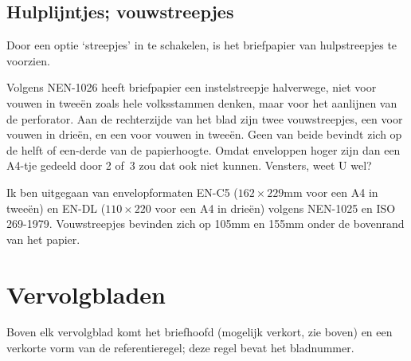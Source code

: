 \subsection{Hulplijntjes; vouwstreepjes}                                        
                                                                                
Door een optie `streepjes' in te schakelen, is het briefpapier                  
van hulpstreepjes te voorzien.                                                  
                                                                                
Volgens NEN-1026 heeft briefpapier een instelstreepje halverwege,               
niet voor vouwen in twee\"en zoals hele volksstammen denken, maar               
voor het aanlijnen van de perforator.                                           
Aan de rechterzijde van het blad zijn twee vouwstreepjes, een                   
voor vouwen in drie\"en, en een voor vouwen in twee\"en.                        
Geen van beide bevindt zich op de helft of een-derde van de                     
papierhoogte. Omdat enveloppen hoger zijn dan een A4-tje gedeeld                
door 2 of~3 zou dat ook niet kunnen. Vensters, weet U wel?                      
                                                                                
Ik ben uitgegaan van envelopformaten EN-C5 ($162\times229$mm                    
voor een A4 in twee\"en) en EN-DL ($110\times220$ voor                          
een A4 in drie\"en) volgens NEN-1025 en ISO 269-1979.                           
Vouwstreepjes bevinden zich op 105mm en 155mm onder de                          
bovenrand van het papier.                                                       
                                                                                
                                                                                
\section{Vervolgbladen}                                                         
                                                                                
Boven elk vervolgblad komt het briefhoofd (mogelijk verkort,                    
zie boven) en een verkorte                                                      
vorm van de referentieregel; deze regel bevat het                               
bladnummer.                                                                     
                                                                                
